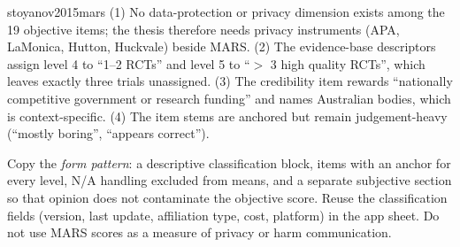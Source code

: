 \begin{papercard}{stoyanov2015mars}
 (1) No data-protection or privacy dimension exists among the 19 objective items; the thesis therefore needs privacy instruments (APA, LaMonica, Hutton, Huckvale) beside MARS. (2) The evidence-base descriptors assign level 4 to ``1--2 RCTs'' and level 5 to ``$>$ 3 high quality RCTs'', which leaves exactly three trials unassigned. (3) The credibility item rewards ``nationally competitive government or research funding'' and names Australian bodies, which is context-specific. (4) The item stems are anchored but remain judgement-heavy (``mostly boring'', ``appears correct'').

 Copy the \emph{form pattern}: a descriptive classification block, items with an anchor for every level, N/A handling excluded from means, and a separate subjective section so that opinion does not contaminate the objective score. Reuse the classification fields (version, last update, affiliation type, cost, platform) in the app sheet. Do not use MARS scores as a measure of privacy or harm communication.
\end{papercard}
